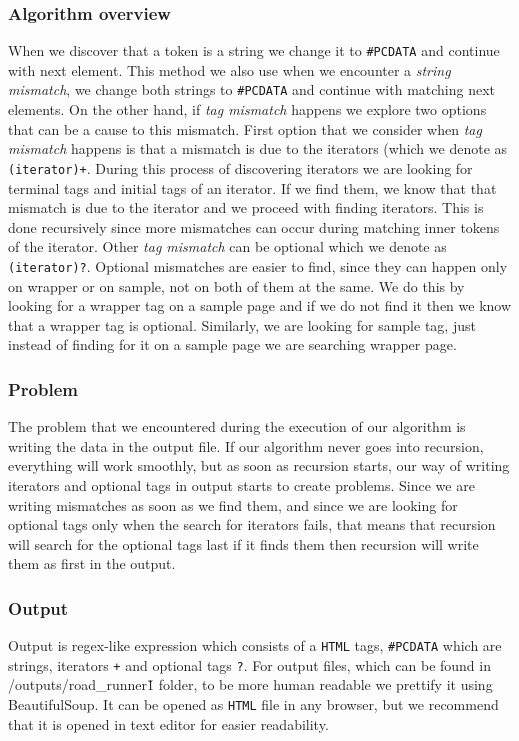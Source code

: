 \documentclass{article}
\begin{document}
	\subsubsection{Algorithm overview}
	When we discover that a token is a string we change it to \texttt{\#PCDATA} and continue with next element. This method we also use when we encounter a \textit{string mismatch}, we change both strings to \texttt{\#PCDATA} and continue with matching next elements.  
	On the other hand, if \textit{tag mismatch} happens we explore two options that can be a cause to this mismatch. 
	First option that we consider when \textit{tag mismatch} happens is that a mismatch is due to the iterators (which we denote as \texttt{(iterator)+}. During this process of discovering iterators we are looking for terminal tags and initial tags of an iterator. If we find them, we know that that mismatch is due to the iterator and we proceed with finding iterators. This is done recursively since more mismatches can occur during matching inner tokens of the iterator. 
	Other \textit{tag mismatch} can be optional which we denote as \texttt{(iterator)?}. Optional mismatches are easier to find, since they can happen only on wrapper or on sample, not on both of them at the same. We do this by looking for a wrapper tag on a sample page and if we do not find it then we know that a wrapper tag is optional. Similarly, we are looking for sample tag, just instead of finding for it on a sample page we are searching wrapper page. 
	
	\subsubsection{Problem}
	The problem that we encountered during the execution of our algorithm is writing the data in the output file. If our algorithm never goes into recursion, everything will work smoothly, but as soon as recursion starts, our way of writing iterators and optional tags in output starts to create problems. Since we are writing mismatches as soon as we find them, and since we are looking for optional tags only when the search for iterators fails, that means that recursion will search for the optional tags last if it finds them then recursion will write them as first in the output.
	
	\subsubsection{Output}
	Output is regex-like expression which consists of a \texttt{HTML} tags, \texttt{\#PCDATA} which are strings, iterators \texttt{+} and optional tags \texttt{?}. 
	For output files, which can be found in /outputs/road\_runner\v1 folder, to be more human readable we prettify it using BeautifulSoup. It can be opened as \texttt{HTML} file in any browser, but we recommend that it is opened in text editor for easier readability.
	
\end{document}
